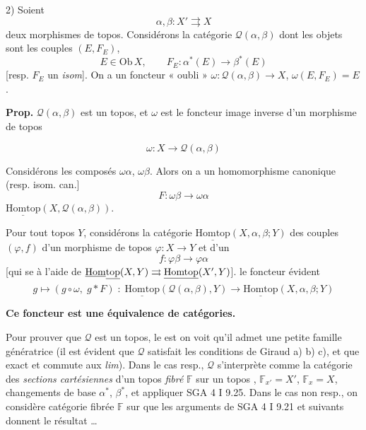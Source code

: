 \documentclass[11pt,a4paper]{article}
\begin{document}
2) Soient
\[
\alpha, \beta : X' \rightrightarrows X
\]
deux morphismes de topos.  Considérons la catégorie
$\mathcal{Q}(\alpha, \beta)$ dont les objets sont les couples $(E, F_E)$,
\[
E \in \mathrm{Ob}\,X, \qquad F_E : \alpha^{*}(E) \longrightarrow \beta^{*}(E)
\]
[resp. $F_E$ un \emph{isom}].  On a un foncteur
« oubli » $\omega : \mathcal{Q}(\alpha, \beta) \longrightarrow X$,
$\omega(E, F_E) = E$.

\textbf{Prop.} \quad $\mathcal{Q}(\alpha, \beta)$ est un topos, et $\omega$
est le foncteur image inverse d'un morphisme de topos


\[
\omega : X \longrightarrow \mathcal{Q}(\alpha, \beta)
\]

Considérons les composés $\omega\alpha$, $\omega\beta$. Alors on a un
homomorphisme canonique (resp. isom. can.]
\[
F : \omega\beta \longrightarrow \omega\alpha
\]
 $\underline{\mathrm{Homtop}}(X, \mathcal{Q}(\alpha, \beta))$.

Pour tout topos $Y$, considérons la catégorie
$\underline{\mathrm{Homtop}}(X, \alpha, \beta ; Y)$ des 
couples $(\varphi, f)$ d'un morphisme de topos $\varphi : X \to Y$ et d'un
\[
f : \varphi\beta \longrightarrow \varphi\alpha
\]
[qui se \ill{} à l'aide de $\underline{\mathrm{Hom}}\struck{\mathrm{top}}(X, Y)
\rightrightarrows \underline{\mathrm{Homtop}}(X', Y)$].  le foncteur évident
\[
g \longmapsto (g \circ \omega,\; g * F) \;:\;
\underline{\mathrm{Homtop}}(\mathcal{Q}(\alpha, \beta), Y) \longrightarrow
\underline{\mathrm{Homtop}}(X, \alpha, \beta ; Y)
\]


\textbf{Ce foncteur est une équivalence de catégories.}

Pour prouver que $\mathcal{Q}$ est un topos, le \ill{} est \ill{} on voit qu'il
admet une petite famille génératrice (il est évident que $\mathcal{Q}$ satisfait
les conditions de Giraud a) b) c), et que \ill{} exact \ill{} et commute aux
\emph{lim}). Dans le cas resp., $\mathcal{Q}$ s'interprète comme la
catégorie des \emph{sections cartésiennes} d'un topos \emph{fibré}
$\mathbb{F}$ \ill{} sur un topos \ill{},
$\mathbb{F}_{x'} = X'$, $\mathbb{F}_x = X$,  changements de
base $\alpha^{*}$, $\beta^{*}$, et \ill{} appliquer SGA 4 I 9.25. Dans le cas
non resp., on considère  \ill{} catégorie fibrée $\mathbb{F}$
\ill{} sur \ill{} que les arguments de SGA 4 I 9.21 et suivants donnent le résultat
…
\end{document}
